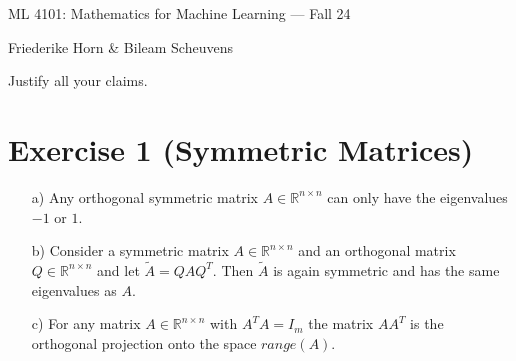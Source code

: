 \documentclass[10pt]{article}
\numberwithin{equation}{section}
\begin{document}
\begin{center}
    \sc ML 4101: Mathematics for Machine Learning --- Fall 24
\end{center}

\noindent Friederike Horn \& Bileam Scheuvens

Justify all your claims.
\section*{Exercise 1 (Symmetric Matrices)}
\begin{enumerate}
\item[a)]{
    Any orthogonal symmetric matrix $A \in \mathbb{R}^{n\times n}$ can only have the eigenvalues $-1$ or $1$.
  }
\item[b)]{
    Consider a symmetric matrix $A \in \mathbb{R}^{n\times n}$ and an orthogonal matrix $Q \in \mathbb{R}^{n\times n}$ and let $\tilde{A} = QAQ^T$. Then $\tilde{A}$ is again symmetric and has the same eigenvalues as $A$.
  }
\item[c)]{
    For any matrix $A \in \mathbb{R}^{n\times n}$ with $A^TA = I_m$ the matrix $AA^T$ is the orthogonal projection onto the space $range(A)$.
  }
\end{enumerate}
\end{document}
